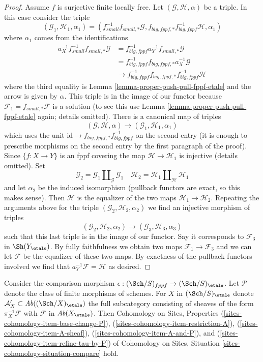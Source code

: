 \begin{proof}
\medskip\noindent
Assume $f$ is surjective finite locally free.
Let $(\mathcal{G}, \mathcal{H}, \alpha)$ be a triple.
In this case consider the triple
$$
(\mathcal{G}_1, \mathcal{H}_1, \alpha_1) =
(f_{small}^{-1}f_{small, *}\mathcal{G},
f_{big, fppf, *}f_{big, fppf}^{-1}\mathcal{H}, \alpha_1)
$$
where $\alpha_1$ comes from the identifications
\begin{align*}
a_X^{-1}f_{small}^{-1}f_{small, *}\mathcal{G}
& =
f_{big, fppf}^{-1}a_Y^{-1}f_{small, *}\mathcal{G} \\
& =
f_{big, fppf}^{-1}f_{big, fppf, *}a_X^{-1}\mathcal{G} \\
& \to
f_{big, fppf}^{-1}f_{big, fppf, *}f_{big, fppf}^{-1}\mathcal{H}
\end{align*}
where the third equality is Lemma \ref{lemma-proper-push-pull-fppf-etale}
and the arrow is given by $\alpha$.
This triple is in the image of our functor because
$\mathcal{F}_1 = f_{small, *}\mathcal{F}$ is a solution
(to see this use Lemma \ref{lemma-proper-push-pull-fppf-etale} again;
details omitted). There is a canonical map of triples
$$
(\mathcal{G}, \mathcal{H}, \alpha)
\to
(\mathcal{G}_1, \mathcal{H}_1, \alpha_1)
$$
which uses the unit $\text{id} \to f_{big, fppf, *}f_{big, fppf}^{-1}$
on the second entry (it is enough to prescribe morphisms on the
second entry by the first paragraph of the proof). Since
$\{f : X \to Y\}$ is an fppf covering the map
$\mathcal{H} \to \mathcal{H}_1$ is injective (details omitted).
Set
$$
\mathcal{G}_2 = \mathcal{G}_1 \amalg_\mathcal{G} \mathcal{G}_1\quad
\mathcal{H}_2 = \mathcal{H}_1 \amalg_\mathcal{H} \mathcal{H}_1
$$
and let $\alpha_2$ be the induced isomorphism (pullback functors
are exact, so this makes sense). Then $\mathcal{H}$ is the
equalizer of the two maps $\mathcal{H}_1 \to \mathcal{H}_2$.
Repeating the arguments above for the triple
$(\mathcal{G}_2, \mathcal{H}_2, \alpha_2)$
we find an injective morphism of triples
$$
(\mathcal{G}_2, \mathcal{H}_2, \alpha_2)
\to
(\mathcal{G}_3, \mathcal{H}_3, \alpha_3)
$$
such that this last triple is in the image of our functor.
Say it corresponds to $\mathcal{F}_3$ in $\Sh(Y_\etale)$.
By fully faithfulness we obtain two maps
$\mathcal{F}_1 \to \mathcal{F}_3$ and we can let
$\mathcal{F}$ be the equalizer of these two maps.
By exactness of the pullback functors involved we
find that $a_Y^{-1}\mathcal{F} = \mathcal{H}$ as desired.
\end{proof}

\begin{lemma}
\label{lemma-compare-fppf-etale}
Consider the comparison morphism
$\epsilon : (\Sch/S)_{fppf} \to (\Sch/S)_\etale$.
Let $\mathcal{P}$ denote the class of finite morphisms of schemes.
For $X$ in $(\Sch/S)_\etale$ denote
$\mathcal{A}'_X \subset \textit{Ab}((\Sch/X)_\etale)$
the full subcategory consisting of sheaves of the form
$\pi_X^{-1}\mathcal{F}$ with $\mathcal{F}$ in $\textit{Ab}(X_\etale)$.
Then Cohomology on Sites, Properties
(\ref{sites-cohomology-item-base-change-P}),
(\ref{sites-cohomology-item-restriction-A}),
(\ref{sites-cohomology-item-A-sheaf}),
(\ref{sites-cohomology-item-A-and-P}), and
(\ref{sites-cohomology-item-refine-tau-by-P})
of Cohomology on Sites, Situation
\ref{sites-cohomology-situation-compare} hold.
\end{lemma}

